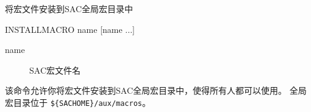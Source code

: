 \label{cmd:installmacro}

将宏文件安装到SAC全局宏目录中

\begin{SACSTX}
INSTALLMACRO name [name ...]
\end{SACSTX}

\begin{description}
\item [name] SAC宏文件名
\end{description}

该命令允许你将宏文件安装到SAC全局宏目录中，使得所有人都可以使用。
全局宏目录位于 \verb|${SACHOME}/aux/macros|。

